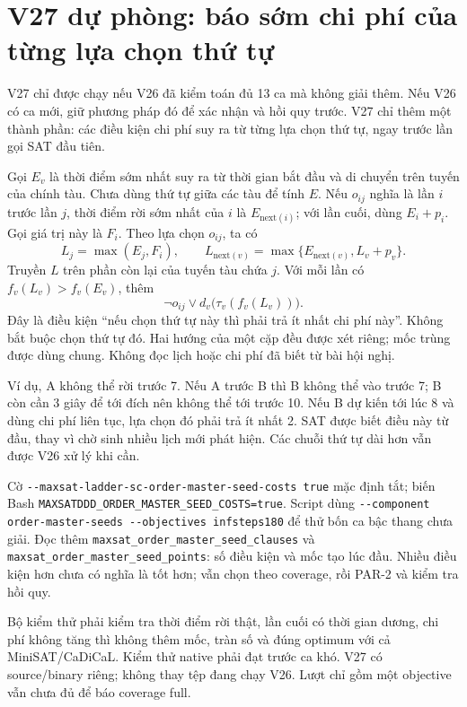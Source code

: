 \documentclass[11pt,a4paper]{article}
\newcommand{\file}[1]{\nolinkurl{#1}}
\begin{document}
\section{V27 dự phòng: báo sớm chi phí của từng lựa chọn thứ tự}

V27 chỉ được chạy nếu V26 đã kiểm toán đủ 13 ca mà không giải thêm.
Nếu V26 có ca mới, giữ phương pháp đó để xác nhận và hồi quy trước.
V27 chỉ thêm một thành phần: các điều kiện chi phí suy ra từ từng
lựa chọn thứ tự, ngay trước lần gọi SAT đầu tiên.

Gọi $E_v$ là thời điểm sớm nhất suy ra từ thời gian bắt đầu và di chuyển
trên tuyến của chính tàu. Chưa dùng thứ tự giữa các tàu để tính $E$.
Nếu $o_{ij}$ nghĩa là lần $i$ trước lần $j$, thời điểm rời sớm nhất của
$i$ là $E_{\mathrm{next}(i)}$; với lần cuối, dùng $E_i+p_i$.
Gọi giá trị này là $F_i$. Theo lựa chọn $o_{ij}$, ta có
\[
 L_j=\max(E_j,F_i),\qquad
 L_{\mathrm{next}(v)}=\max\{E_{\mathrm{next}(v)},L_v+p_v\}.
\]
Truyền $L$ trên phần còn lại của tuyến tàu chứa $j$. Với mỗi lần có
$f_v(L_v)>f_v(E_v)$, thêm
\[
 \neg o_{ij}\lor d_v\bigl(\tau_v(f_v(L_v))\bigr).
\]
Đây là điều kiện ``nếu chọn thứ tự này thì phải trả ít nhất chi phí
này''. Không bắt buộc chọn thứ tự đó. Hai hướng của một cặp đều được
xét riêng; mốc trùng được dùng chung. Không đọc lịch hoặc chi phí đã
biết từ bài hội nghị.

Ví dụ, A không thể rời trước 7. Nếu A trước B thì B không thể vào trước
7; B còn cần 3 giây để tới đích nên không thể tới trước 10. Nếu B dự
kiến tới lúc 8 và dùng chi phí liên tục, lựa chọn đó phải trả ít nhất 2.
SAT được biết điều này từ đầu, thay vì chờ sinh nhiều lịch mới phát
hiện. Các chuỗi thứ tự dài hơn vẫn được V26 xử lý khi cần.

Cờ \file{--maxsat-ladder-sc-order-master-seed-costs true} mặc định tắt;
biến Bash \file{MAXSATDDD_ORDER_MASTER_SEED_COSTS=true}. Script dùng
\file{--component order-master-seeds --objectives infsteps180} để thử
bốn ca bậc thang chưa giải. Đọc thêm
\file{maxsat_order_master_seed_clauses} và
\file{maxsat_order_master_seed_points}: số điều kiện và mốc tạo lúc đầu.
Nhiều điều kiện hơn chưa có nghĩa là tốt hơn; vẫn chọn theo coverage,
rồi PAR-2 và kiểm tra hồi quy.

Bộ kiểm thử phải kiểm tra thời điểm rời thật, lần cuối có thời gian
dương, chi phí không tăng thì không thêm mốc, tràn số và đúng optimum
với cả MiniSAT/CaDiCaL. Kiểm thử native phải đạt trước ca khó. V27 có
source/binary riêng; không thay tệp đang chạy V26. Lượt chỉ gồm một
objective vẫn chưa đủ để báo coverage full.
\end{document}

